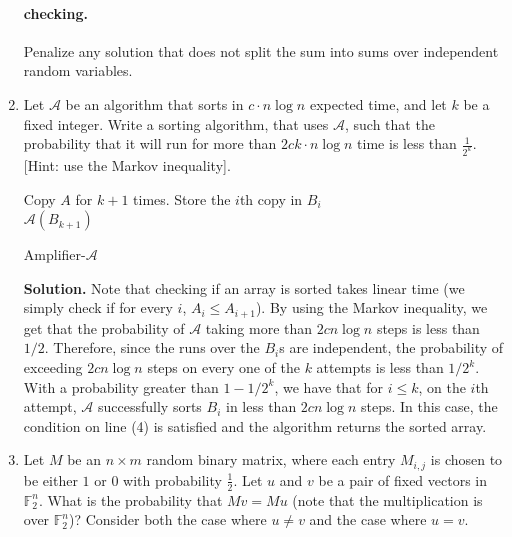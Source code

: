 \begin{enumerate}
  \paragraph{checking.} Penalize any solution that does not split the sum into sums over independent random variables.
\fi 

\item {} Let $\mathcal{A}$ be an algorithm that sorts in $c \cdot n\log n$ expected time, and let $k$ be a fixed integer. Write a sorting algorithm, that uses $\mathcal{A}$, such that the probability that it will run for more than $2ck \cdot n\log n$ time is less than $\frac{1}{2^{k}}$. [Hint: use the Markov inequality].



\begin{algorithm}
  Copy $A$ for $k+1$ times. Store the $i$th copy in $B_{i}$\\
\Return $\mathcal{A}(B_{k+1})$ 
\caption{ Amplifier-$\mathcal{A}$ }
  \label{alg:randsort}
  \end{algorithm} 

\ifdefined\SOLUTION
  \textbf{Solution.} Note that checking if an array is sorted takes linear time (we simply check if for every $i$, $A_{i}\le A_{i+1}$). By using the Markov inequality, we get that the probability of $\mathcal{A}$ taking more than $2cn\log n$ steps is less than $1/2$. Therefore, since the runs over the $B_{i}$s are independent, the probability of exceeding $2cn\log n$ steps on every one of the $k$ attempts is less than $1/2^{k}$. With a probability greater than $1- 1/2^{k}$, we have that for $i \le k$, on the $i$th attempt, $\mathcal{A}$ successfully sorts $B_{i}$ in less than $2c n\log n$ steps. In this case, the condition on line (4) is satisfied and the algorithm returns the sorted array.
\fi
\item  {} Let $M$ be an $n\times m$ random binary matrix, where each entry $M_{i,j}$ is chosen to be either $1$ or $0$ with probability $\frac{1}{2}$. Let $u$ and $v$ be a pair of fixed vectors in $\mathbb{F}_{2}^{n}$. What is the probability that $Mv = Mu$ (note that the multiplication is over $\mathbb{F}_{2}^n$)? Consider both the case where $u\neq v$ and the case where $u=v$.
\ifdefined\SOLUTION


\end{enumerate}
